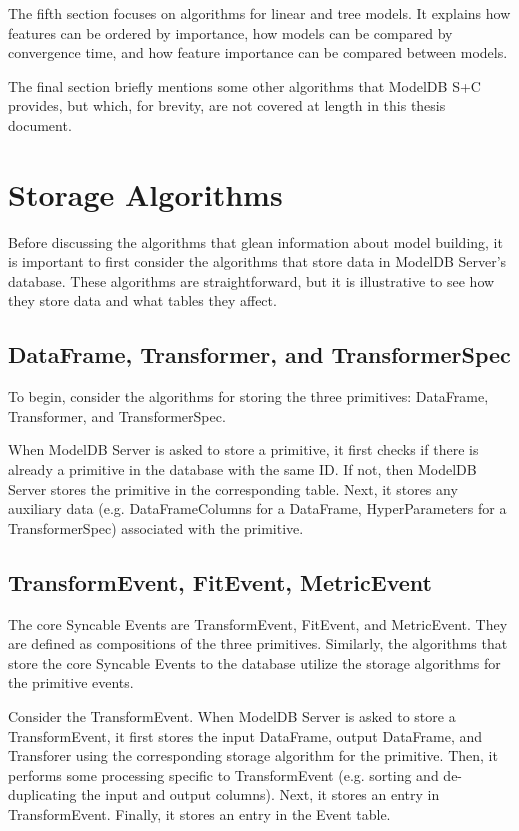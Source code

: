 The fifth section focuses on algorithms for linear and tree models. It explains
how features can be ordered by importance, how models can be compared by convergence time,
and how feature importance can be compared between models.

The final section briefly mentions some other algorithms that ModelDB S+C provides, but which,
for brevity, are not covered at length in this thesis document.

\section{Storage Algorithms}
Before discussing the algorithms that glean information about model building, it
is important to first consider the algorithms that store data in ModelDB Server's 
database. These algorithms are straightforward, but it is illustrative to see
how they store data and what tables they affect.

\subsection{DataFrame, Transformer, and TransformerSpec}
To begin, consider the algorithms for storing the three primitives: DataFrame, 
Transformer, and TransformerSpec.

When ModelDB Server is asked to store a primitive, it first checks if there is already
a primitive in the database with the same ID. If not, then ModelDB Server stores the primitive
in the corresponding table. Next, it stores any auxiliary data (e.g. DataFrameColumns for a DataFrame, 
HyperParameters for a TransformerSpec) associated with the primitive.

\subsection{TransformEvent, FitEvent, MetricEvent}
The core Syncable Events are TransformEvent, FitEvent, and MetricEvent. They
are defined as compositions of the three primitives. Similarly, the algorithms
that store the core Syncable Events to the database utilize the storage algorithms
for the primitive events.

Consider the TransformEvent. When ModelDB Server is asked to store a TransformEvent, it
first stores the input DataFrame, output DataFrame, and Transforer using the corresponding
storage algorithm for the primitive. Then, it performs some processing specific to
TransformEvent (e.g. sorting and de-duplicating the input and output columns). Next,
it stores an entry in TransformEvent. Finally, it stores an entry in the Event table.

